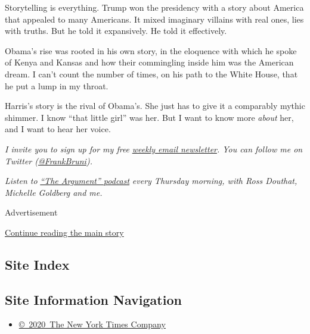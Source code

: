 Storytelling is everything. Trump won the presidency with a story about
America that appealed to many Americans. It mixed imaginary villains
with real ones, lies with truths. But he told it expansively. He told it
effectively.

Obama's rise was rooted in his own story, in the eloquence with which he
spoke of Kenya and Kansas and how their commingling inside him was the
American dream. I can't count the number of times, on his path to the
White House, that he put a lump in my throat.

Harris's story is the rival of Obama's. She just has to give it a
comparably mythic shimmer. I know ``that little girl'' was her. But I
want to know more \emph{about} her, and I want to hear her voice.

\emph{I invite you to sign up for my free}
\href{https://www.nytimes3xbfgragh.onion/newsletters/frank-bruni}{\emph{weekly
email newsletter}}\emph{. You can follow me on Twitter
(}\href{https://twitter.com/FrankBruni}{\emph{@FrankBruni}}\emph{).}

\emph{Listen to}
\href{https://www.nytimes3xbfgragh.onion/column/the-argument}{\emph{``The
Argument'' podcast}} \emph{every Thursday morning, with Ross Douthat,
Michelle Goldberg and me.}

Advertisement

\protect\hyperlink{after-bottom}{Continue reading the main story}

\hypertarget{site-index}{%
\subsection{Site Index}\label{site-index}}

\hypertarget{site-information-navigation}{%
\subsection{Site Information
Navigation}\label{site-information-navigation}}

\begin{itemize}
\tightlist
\item
  \href{https://help.nytimes3xbfgragh.onion/hc/en-us/articles/115014792127-Copyright-notice}{©~2020~The
  New York Times Company}
\end{itemize}

